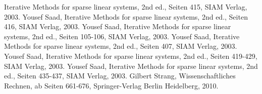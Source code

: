 \begin{thebibliography}{56}
Iterative Methods for sparse linear systems,
2nd ed.,
Seiten 415,
SIAM Verlag,
2003.
Yousef Saad,
Iterative Methods for sparse linear systems,
2nd ed.,
Seiten 416,
SIAM Verlag,
2003.
Yousef Saad,
Iterative Methods for sparse linear systems,
2nd ed.,
Seiten 105-106,
SIAM Verlag,
2003.
Yousef Saad,
Iterative Methods for sparse linear systems,
2nd ed.,
Seiten 407,
SIAM Verlag,
2003.
Yousef Saad,
Iterative Methods for sparse linear systems,
2nd ed.,
Seiten 419-429,
SIAM Verlag,
2003.
Yousef Saad,
Iterative Methods for sparse linear systems,
2nd ed.,
Seiten 435-437,
SIAM Verlag,
2003.
Gilbert Strang,
Wissenschaftliches Rechnen,
ab Seiten 661-676,
Springer-Verlag Berlin Heidelberg,
2010.

\end{thebibliography}

